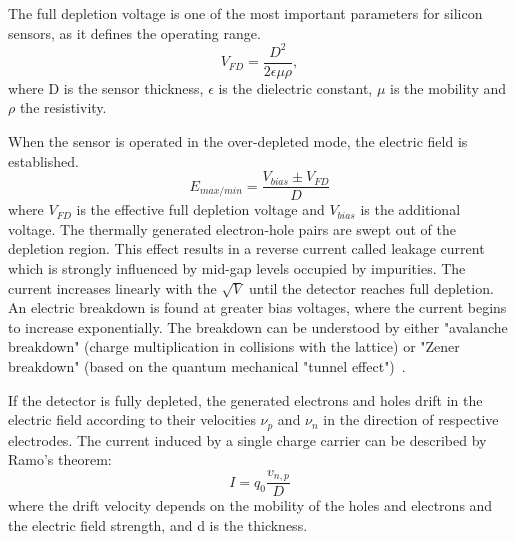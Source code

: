 The full depletion voltage is one of the most important parameters for silicon sensors, as it defines the operating range. 
\begin{equation}
    V_{FD} = \frac{D^{2}}{2\epsilon \mu \rho},
\end{equation}
where D is the sensor thickness, $\epsilon$ is the dielectric constant, $\mu$ is the mobility and $\rho$ the resistivity.

When the sensor is operated in the over-depleted mode, the electric field is established.
\begin{equation}
    E_{max/min} = \frac{V_{bias}\pm V_{FD}}{D}
\end{equation}
where $V_{FD}$ is the effective full depletion voltage and $V_{bias}$ is the additional voltage. The thermally generated electron-hole pairs are swept out of the depletion region. This effect results in a reverse current called leakage current which is strongly influenced by mid-gap levels occupied by impurities. The current increases linearly with the $\sqrt{V}$ until the detector reaches full depletion. An electric breakdown is found at greater bias voltages, where the current begins to increase exponentially. The breakdown can be understood by either "avalanche breakdown" (charge multiplication in collisions with the lattice) or "Zener breakdown" (based on the quantum mechanical "tunnel effect")~\cite{Hartmann:2017gzy}.

If the detector is fully depleted, the generated electrons and holes drift in the electric field according to their velocities $\nu_{p}$ and $\nu_{n}$ in the direction of respective electrodes. The current induced by a single charge carrier can be described by Ramo's theorem:
\begin{equation}
    I = q_{0}\frac{v_{n,p}}{D}
\end{equation}
where the drift velocity depends on the mobility of the holes and electrons and the electric field strength, and d is the thickness.

